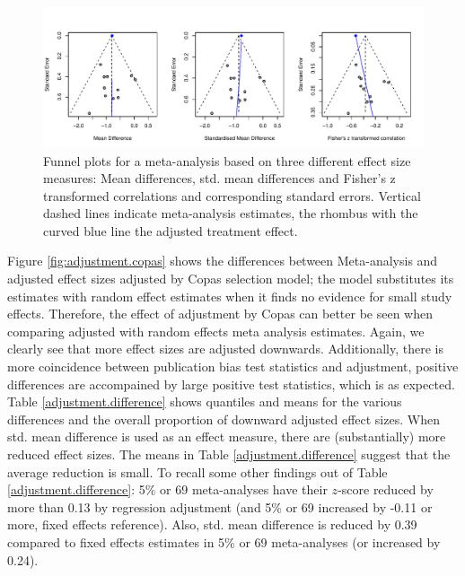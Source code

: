 \documentclass[11pt,a4paper,twoside]{book}\usepackage[]{graphicx}\usepackage[]{color}
\newenvironment{knitrout}{}{} %
\begin{document}
\begin{figure}
\begin{knitrout}
\color{fgcolor}

{\centering \includegraphics[width=\textwidth-3cm]{figure/ch03_figunnamed-chunk-21-1} 

}



\end{knitrout}
\caption{Funnel plots for a meta-analysis based on three different effect size measures: Mean differences, std. mean differences and Fisher's z transformed correlations and corresponding standard errors. Vertical dashed lines indicate meta-analysis estimates, the rhombus with the curved blue line the adjusted treatment effect.}
\label{fig:funnel.plot.change}
\end{figure}


Figure \ref{fig:adjustment.copas} shows the differences between Meta-analysis and adjusted effect sizes adjusted by Copas selection model; the model substitutes its estimates with random effect estimates when it finds no evidence for small study effects. Therefore, the effect of adjustment by Copas can better be seen when comparing adjusted with random effects meta analysis estimates. Again, we clearly see that more effect sizes are adjusted downwards. Additionally, there is more coincidence between publication bias test statistics and adjustment, \ie positive differences are accompained by large positive test statistics, which is as expected. \\
Table \ref{adjustment.difference} shows quantiles and means for the various differences and the overall proportion of downward adjusted effect sizes. When std. mean difference is used as an effect measure, there are (substantially) more reduced effect sizes. The means in Table \ref{adjustment.difference} suggest that the average reduction is small. To recall some other findings out of Table \ref{adjustment.difference}: 5\% or 69 meta-analyses have their $z$-score reduced by more than 0.13 by regression adjustment (and 5\% or 69 increased by -0.11 or more, fixed effects reference). Also, std. mean difference is reduced by 0.39 compared to fixed effects estimates in 5\% or 69 meta-analyses (or increased by 0.24). 
\end{document}
